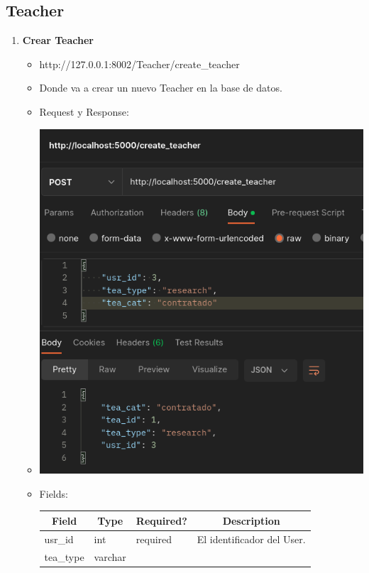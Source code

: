 \documentclass{article}
\begin{document}
\subsection{Teacher}
\begin{enumerate}
    \item \textbf{Crear Teacher}
    \begin{itemize}
        \item http://127.0.0.1:8002/Teacher/create\_teacher
        \item Donde va a crear un nuevo Teacher en la base de datos.
        \item Request y Response:
        \item \includegraphics[scale=.5]{assets/teacher/create.png}
        \item Fields:
        \begin{table}[H] \centering \begin{tabular}{|l|l|l|l|} \hline
        \multicolumn{1}{|c|}{\textbf{Field}} &
        \multicolumn{1}{c|}{\textbf{Type}} &
        \multicolumn{1}{c|}{\textbf{Required?}} &
        \multicolumn{1}{c|}{\textbf{Description}} \\ \hline usr\_id & int &
        required & El identificador del User. \\ \hline tea\_type & varchar &

\end{tabular}
\end{table}
\end{itemize}
\end{enumerate}
\end{document}
